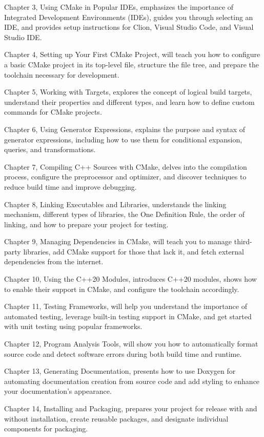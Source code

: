 Chapter 3, Using CMake in Popular IDEs, emphasizes the importance of Integrated Development Environments (IDEs), guides you through selecting an IDE, and provides setup instructions for Clion, Visual Studio Code, and Visual Studio IDE.

Chapter 4, Setting up Your First CMake Project, will teach you how to configure a basic CMake project in its top-level file, structure the file tree, and prepare the toolchain necessary for development.

Chapter 5, Working with Targets, explores the concept of logical build targets, understand their properties and different types, and learn how to define custom commands for CMake projects.

Chapter 6, Using Generator Expressions, explains the purpose and syntax of generator expressions, including how to use them for conditional expansion, queries, and transformations.

Chapter 7, Compiling C++ Sources with CMake, delves into the compilation process, configure the preprocessor and optimizer, and discover techniques to reduce build time and improve debugging.

Chapter 8, Linking Executables and Libraries, understands the linking mechanism, different types of libraries, the One Definition Rule, the order of linking, and how to prepare your project for testing.

Chapter 9, Managing Dependencies in CMake, will teach you to manage third-party libraries, add CMake support for those that lack it, and fetch external dependencies from the internet.

Chapter 10, Using the C++20 Modules, introduces C++20 modules, shows how to enable their support in CMake, and configure the toolchain accordingly.

Chapter 11, Testing Frameworks, will help you understand the importance of automated testing, leverage built-in testing support in CMake, and get started with unit testing using popular frameworks.

Chapter 12, Program Analysis Tools, will show you how to automatically format source code and detect software errors during both build time and runtime.

Chapter 13, Generating Documentation, presents how to use Doxygen for automating documentation creation from source code and add styling to enhance your documentation’s appearance.

Chapter 14, Installing and Packaging, prepares your project for release with and without installation, create reusable packages, and designate individual components for packaging.

